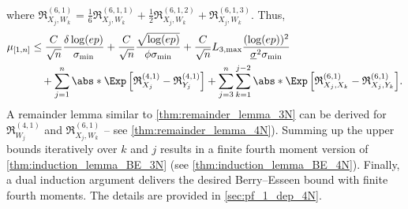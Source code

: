 \documentclass[aos]{imsart}
\begin{document}
where $\mathfrak{R}_{X_j,W_k}^{(6,1)} = \frac{1}{6} \mathfrak{R}_{X_j,W_k}^{(6,1,1)} + \frac{1}{2} \mathfrak{R}_{X_j,W_k}^{(6,1,2)} + \mathfrak{R}_{X_j,W_k}^{(6,1,3)}$. Thus,
\begin{equation*}
\begin{aligned}
    \mu_{[1,n]}
    & \leq \frac{C}{\sqrt{n}} \frac{\delta \log(ep)}{\sigma_{\min}}  
    + \frac{C}{\sqrt{n}} \frac{\sqrt{\log(ep)}}{\phi \sigma_{\min}} 
    + \frac{C}{\sqrt{n}} L_{3,\max} \frac{(\log(ep))^2}{\underline\sigma^2 \sigma_{\min}} \\
    & \quad + \sum_{j=1}^{n} \abs*{ \Exp \left[ \mathfrak{R}_{X_j}^{(4,1)} 
        - \mathfrak{R}_{Y_j}^{(4,1)} \right] }
    + \sum_{j=3}^{n} \sum_{k=1}^{j-2} \abs*{ \Exp \left[ 
        \mathfrak{R}_{X_j,X_k}^{(6,1)}
        - \mathfrak{R}_{X_j,Y_k}^{(6,1)}
    \right] }.
\end{aligned}
\end{equation*}
A remainder lemma similar to \cref{thm:remainder_lemma_3N} can be derived for $\mathfrak{R}_{W_j}^{(4,1)}$ and $\mathfrak{R}_{X_j,W_k}^{(6,1)}$ -- see \cref{thm:remainder_lemma_4N}). Summing up the upper bounds iteratively over $k$ and $j$ results in a finite fourth moment version of \cref{thm:induction_lemma_BE_3N} (see \cref{thm:induction_lemma_BE_4N}). Finally, a dual induction argument delivers the desired Berry--Esseen bound with finite fourth moments. The details are provided in \cref{sec:pf_1_dep_4N}.

\end{document}
